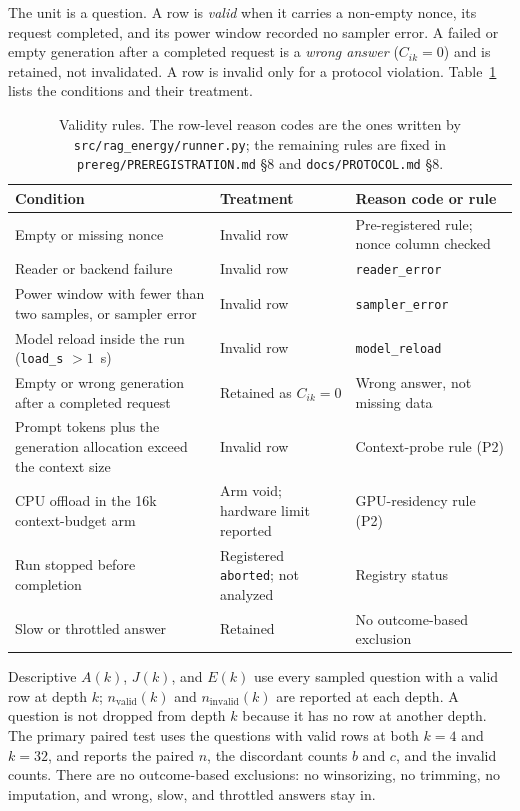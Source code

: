 The unit is a question. A row is \emph{valid} when it carries a non-empty nonce, its request
completed, and its power window recorded no sampler error. A failed or empty generation after a
completed request is a \emph{wrong answer} ($C_{ik}=0$) and is retained, not invalidated. A row
is invalid only for a protocol violation. Table~\ref{s:tab:validity} lists the conditions and their
treatment.

\begin{table}[pos=htbp]
  \centering
  \caption{Validity rules. The row-level reason codes are the ones written by
  \texttt{src/rag\_energy/runner.py}; the remaining rules are fixed in
  \texttt{prereg/PREREGISTRATION.md} \S8 and \texttt{docs/PROTOCOL.md} \S8.}
  \label{s:tab:validity}
  \small
  \begin{tabularx}{\textwidth}{>{\raggedright\arraybackslash}p{4.4cm}>{\raggedright\arraybackslash}p{2.6cm}>{\raggedright\arraybackslash}X}
    \toprule
    \textbf{Condition} & \textbf{Treatment} & \textbf{Reason code or rule} \\
    \midrule
    Empty or missing nonce & Invalid row & Pre-registered rule; nonce column checked \\
    Reader or backend failure & Invalid row & \texttt{reader\_error} \\
    Power window with fewer than two samples, or sampler error & Invalid row & \texttt{sampler\_error} \\
    Model reload inside the run (\texttt{load\_s} $>1$~s) & Invalid row & \texttt{model\_reload} \\
    Empty or wrong generation after a completed request & Retained as $C_{ik}=0$ & Wrong answer, not missing data \\
    Prompt tokens plus the generation allocation exceed the context size & Invalid row & Context-probe rule (P2) \\
    CPU offload in the 16k context-budget arm & Arm void; hardware limit reported & GPU-residency rule (P2) \\
    Run stopped before completion & Registered \texttt{aborted}; not analyzed & Registry status \\
    Slow or throttled answer & Retained & No outcome-based exclusion \\
    \bottomrule
  \end{tabularx}
\end{table}

Descriptive $A(k)$, $J(k)$, and $E(k)$ use every sampled question with a valid row at depth $k$;
$n_{\mathrm{valid}}(k)$ and $n_{\mathrm{invalid}}(k)$ are reported at each depth. A question is
not dropped from depth $k$ because it has no row at another depth. The primary paired test uses
the questions with valid rows at both $k=4$ and $k=32$, and reports the paired $n$, the
discordant counts $b$ and $c$, and the invalid counts. There are no outcome-based exclusions: no
winsorizing, no trimming, no imputation, and wrong, slow, and throttled answers stay in.

